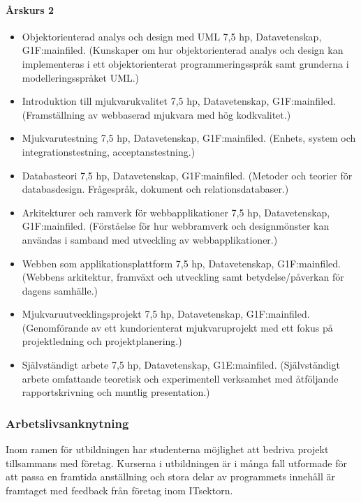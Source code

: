 \documentclass[swedish]{LnuCmThesis}
\begin{document}
\paragraph*{Årskurs 2}

\begin{itemize}
    \item Objektorienterad analys och design med UML 7,5 hp, Datavetenskap, G1F\fn:mainfiled{}. (Kunskaper om hur objektorienterad analys och design kan implementeras i ett objektorienterat programmeringsspråk samt grunderna i modelleringsspråket UML.)
    \item Introduktion till mjukvarukvalitet 7,5 hp, Datavetenskap, G1F\fn:mainfiled{}. (Framställning av webbaserad mjukvara med hög kodkvalitet.)
    \item Mjukvarutestning 7,5 hp, Datavetenskap, G1F\fn:mainfiled{}. (Enhets­, system­ och integrationstestning, acceptanstestning.)
    \item Databasteori 7,5 hp, Datavetenskap, G1F\fn:mainfiled{}. (Metoder och teorier för databasdesign. Frågespråk, dokument­ och relationsdatabaser.)
    \item Arkitekturer och ramverk för webbapplikationer 7,5 hp, Datavetenskap, G1F\fn:mainfiled{}. (Förståelse för hur webbramverk och designmönster kan användas i samband med utveckling av webbapplikationer.)
    \item Webben som applikationsplattform 7,5 hp, Datavetenskap, G1F\fn:mainfiled{}. (Webbens arkitektur, framväxt och utveckling samt betydelse/påverkan för dagens samhälle.)
    \item Mjukvaruutvecklingsprojekt 7,5 hp, Datavetenskap, G1F\fn:mainfiled{}. (Genomförande av ett kundorienterat mjukvaruprojekt med ett fokus på projektledning och projektplanering.)
    \item Självständigt arbete 7,5 hp, Datavetenskap, G1E\fn:mainfiled{}. (Självständigt arbete omfattande teoretisk och experimentell verksamhet med åtföljande rapportskrivning och muntlig presentation.)
\end{itemize}

\subsubsection*{Arbetslivsanknytning}

Inom ramen för utbildningen har studenterna möjlighet att bedriva projekt tillsammans
med företag. Kurserna i utbildningen är i många fall utformade för att passa en framtida
anställning och stora delar av programmets innehåll är framtaget med feedback från
företag inom IT­sektorn.
\end{document}
